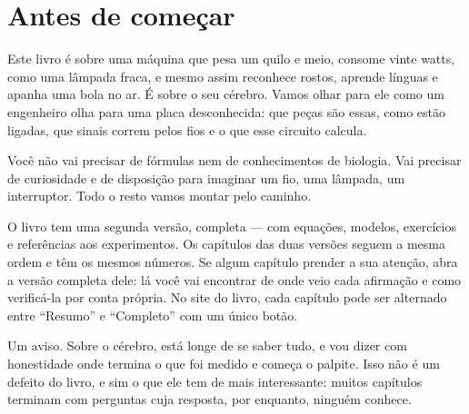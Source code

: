 \chapter*{Antes de começar}

Este livro é sobre uma máquina que pesa um quilo e meio, consome vinte watts, como uma lâmpada fraca, e mesmo assim reconhece rostos, aprende línguas e apanha uma bola no ar. É sobre o seu cérebro. Vamos olhar para ele como um engenheiro olha para uma placa desconhecida: que peças são essas, como estão ligadas, que sinais correm pelos fios e o que esse circuito calcula.

Você não vai precisar de fórmulas nem de conhecimentos de biologia. Vai precisar de curiosidade e de disposição para imaginar um fio, uma lâmpada, um interruptor. Todo o resto vamos montar pelo caminho.

O livro tem uma segunda versão, completa --- com equações, modelos, exercícios e referências aos experimentos. Os capítulos das duas versões seguem a mesma ordem e têm os mesmos números. Se algum capítulo prender a sua atenção, abra a versão completa dele: lá você vai encontrar de onde veio cada afirmação e como verificá-la por conta própria. No site do livro, cada capítulo pode ser alternado entre ``Resumo'' e ``Completo'' com um único botão.

Um aviso. Sobre o cérebro, está longe de se saber tudo, e vou dizer com honestidade onde termina o que foi medido e começa o palpite. Isso não é um defeito do livro, e sim o que ele tem de mais interessante: muitos capítulos terminam com perguntas cuja resposta, por enquanto, ninguém conhece.
